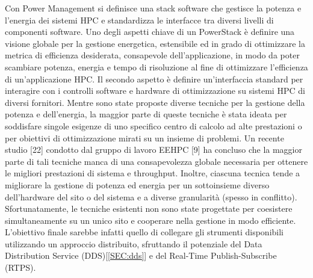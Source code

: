 Con Power Management si definisce una stack software che gestisce la potenza e l'energia dei sistemi HPC e standardizza le interfacce tra diversi livelli di componenti software. Uno degli aspetti chiave di un PowerStack è definire una visione globale per la gestione energetica, estensibile ed in grado di ottimizzare la metrica di efficienza desiderata, consapevole dell'applicazione, in modo da poter scambiare potenza, energia e tempo di risoluzione al fine di ottimizzare l'efficienza di un'applicazione HPC. 
Il secondo aspetto è definire un'interfaccia standard per interagire con i controlli software e hardware di ottimizzazione su sistemi HPC di diversi fornitori.
Mentre sono state proposte diverse tecniche per la gestione della potenza e dell'energia, la maggior parte di queste tecniche è stata ideata per soddisfare singole esigenze di uno specifico centro di calcolo ad alte prestazioni o per obiettivi di ottimizzazione mirati su un insieme di problemi. Un recente studio [22] condotto dal gruppo di lavoro EEHPC [9] ha concluso che la maggior parte di tali tecniche manca di una consapevolezza globale necessaria per ottenere le migliori prestazioni di sistema e throughput. Inoltre, ciascuna tecnica tende a migliorare la gestione di potenza ed energia per un sottoinsieme diverso dell'hardware del sito o del sistema e a diverse granularità (spesso in conflitto). Sfortunatamente, le tecniche esistenti non sono state progettate per coesistere simultaneamente su un unico sito e cooperare nella gestione in modo efficiente. %
L'obiettivo finale sarebbe infatti quello di collegare gli strumenti disponibili utilizzando un approccio distribuito, sfruttando il potenziale del Data Distribution Service (DDS)[\ref{SEC:dds}] e del Real-Time Publish-Subscribe (RTPS).


